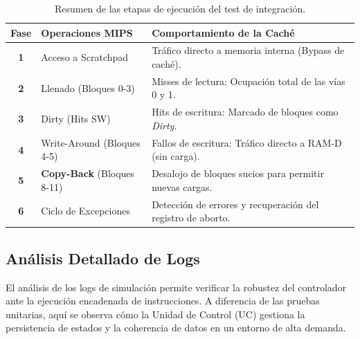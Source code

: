 \documentclass[12pt,a4paper]{article}
\begin{document}
\begin{table}[H]
\centering
\small
\renewcommand{\arraystretch}{1.2}
\begin{tabular}{|c|l|l|}
\hline
\rowcolor[HTML]{EFEFEF} 
\textbf{Fase} & \textbf{Operaciones MIPS} & \textbf{Comportamiento de la Caché} \\ \hline
\textbf{1} & Acceso a Scratchpad & Tráfico directo a memoria interna (Bypass de caché). \\ \hline
\textbf{2} & Llenado (Bloques 0-3) & Misses de lectura: Ocupación total de las vías 0 y 1. \\ \hline
\textbf{3} & Dirty  (Hits SW) & Hits de escritura: Marcado de bloques como \textit{Dirty}. \\ \hline
\textbf{4} & Write-Around (Bloques 4-5) & Fallos de escritura: Tráfico directo a RAM-D (sin carga). \\ \hline
\textbf{5} & \textbf{Copy-Back} (Bloques 8-11) & Desalojo de bloques sucios para permitir nuevas cargas. \\ \hline
\textbf{6} & Ciclo de Excepciones & Detección de errores y recuperación del registro de aborto. \\ \hline
\end{tabular}
\caption{Resumen de las etapas de ejecución del test de integración.}
\end{table}

\subsection{Análisis Detallado de Logs}

El análisis de los logs de simulación permite verificar la robustez del controlador ante la ejecución encadenada de instrucciones. A diferencia de las pruebas unitarias, aquí se observa cómo la Unidad de Control (UC) gestiona la persistencia de estados y la coherencia de datos en un entorno de alta demanda.
\end{document}
